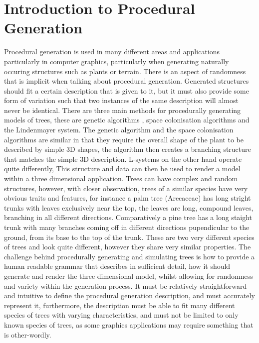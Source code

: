 \section{Introduction to Procedural Generation}

\begin{flushleft}

Procedural generation is used in many different areas and applications particularly in computer graphics, particularly when generating naturally occuring structures such as plants or terrain. There is an aspect of randomness that is implicit when talking about procedural generation. Generated structures should fit a certain description that is given to it, but it must also provide some form of variation such that two instances of the same description will almost never be identical. There are three main methods for procedurally generating models of trees, these are genetic algorithms \cite{haubenwallner2017shapegenetics}, space colonisation algorithms\cite{juuso2017procedural} and the Lindenmayer system. The genetic algorithm and the  space colonisation algorithms are similar in that they require the overall shape of the plant to be described by simple 3D shapes, the algorithm then creates a branching structure that matches the simple 3D description. L-systems on the other hand operate quite differently,  This structure and data can then be used to render a model within a three dimensional application. Trees can have complex and random structures, however, with closer observation, trees of a similar species have very obvious traits and features, for instance a palm tree (Arecaceae) has long stright trunks with leaves exclusively near the top, the leaves are long, compound leaves, branching in all different directions. Comparatively a pine tree has a long staight trunk with many branches coming off in different directions pupendicular to the ground, from its base to the top of the trunk. These are two very different species of trees and look quite different, however they share very similar properties. The challenge behind procedurally generating and simulating trees is how to provide a human readable grammar that describes in sufficient detail, how it should generate and render the three dimensional model, whilst allowing for randomness and variety within the generation process. It must be relatively straightforward and intuitive to define the procedural generation description, and must accurately represent it, furthermore, the description must be able to fit many different species of trees with varying characteristics, and must not be limited to only known species of trees, as some graphics applications may require something that is other-wordly.

\end{flushleft}


